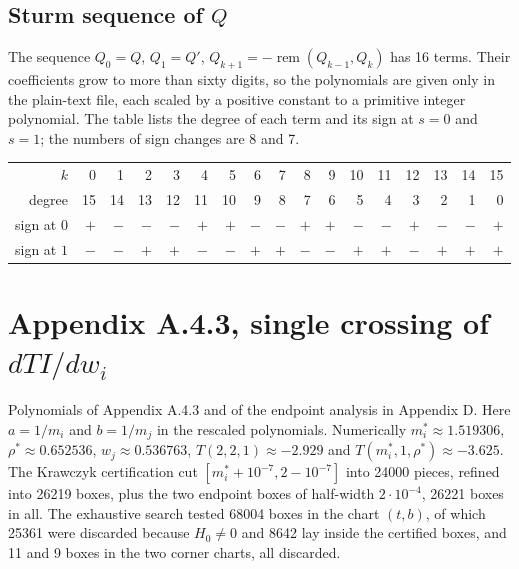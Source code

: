 \subsection*{Sturm sequence of $Q$}
The sequence $Q_0=Q$, $Q_1=Q'$, $Q_{k+1}=-\operatorname{rem}(Q_{k-1},Q_k)$ has 16 terms. Their coefficients grow to more than sixty digits, so the polynomials are given only in the plain-text file, each scaled by a positive constant to a primitive integer polynomial. The table lists the degree of each term and its sign at $s=0$ and $s=1$; the numbers of sign changes are 8 and 7.

\begin{center}\begin{tabular}{rrrrrrrrrrrrrrrrr}
$k$ & 0 & 1 & 2 & 3 & 4 & 5 & 6 & 7 & 8 & 9 & 10 & 11 & 12 & 13 & 14 & 15\\
degree & 15 & 14 & 13 & 12 & 11 & 10 & 9 & 8 & 7 & 6 & 5 & 4 & 3 & 2 & 1 & 0\\
sign at $0$ & $+$ & $-$ & $-$ & $-$ & $+$ & $+$ & $-$ & $-$ & $+$ & $+$ & $-$ & $-$ & $+$ & $-$ & $-$ & $+$\\
sign at $1$ & $-$ & $-$ & $+$ & $+$ & $-$ & $-$ & $+$ & $+$ & $-$ & $-$ & $+$ & $+$ & $-$ & $+$ & $+$ & $+$
\end{tabular}\end{center}


\section*{Appendix A.4.3, single crossing of $dTI/dw_i$}
Polynomials of Appendix A.4.3 and of the endpoint analysis in Appendix D. Here $a=1/m_i$ and $b=1/m_j$ in the rescaled polynomials. Numerically $m_i^*\approx1.519306$, $\rho^*\approx0.652536$, $\hat w_j\approx0.536763$, $T(2,2,1)\approx-2.929$ and $T(m_i^*,1,\rho^*)\approx-3.625$. The Krawczyk certification cut $[m_i^*+10^{-7},2-10^{-7}]$ into 24000 pieces, refined into 26219 boxes, plus the two endpoint boxes of half-width $2\cdot10^{-4}$, 26221 boxes in all. The exhaustive search tested 68004 boxes in the chart $(t,b)$, of which 25361 were discarded because $H_0\neq0$ and 8642 lay inside the certified boxes, and 11 and 9 boxes in the two corner charts, all discarded.

